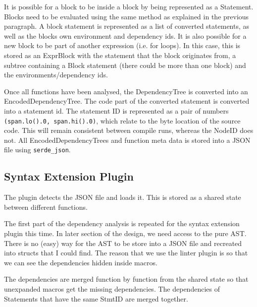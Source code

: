 It is possible for a block to be inside a block by being represented as a Statement. Blocks need to be evaluated using the same method as explained in the previous paragraph. A block statement is represented as a list of converted statements, as well as the blocks own environment and dependency ids. It is also possible for a new block to be part of another expression (i.e. for loops). In this case, this is stored as an ExprBlock with the statement that the block originates from, a subtree containing a Block statement (there could be more than one block) and the environments/dependency ids.

Once all functions have been analysed, the DependencyTree is converted into an EncodedDependencyTree. The code part of the converted statement is converted into a statement id. The statement ID is represented as a pair of numbers \texttt{(span.lo().0, span.hi().0)}, which relate to the byte location of the source code. This will remain consistent between compile runs, whereas the NodeID does not. All EncodedDependencyTrees and function meta data is stored into a JSON file using \texttt{serde\_json}.


\subsection{Syntax Extension Plugin}

The plugin detects the JSON file and loads it. This is stored as a shared state between different functions.

The first part of the dependency analysis is repeated for the syntax extension plugin this time. In later section of the design, we need access to the pure AST. There is no (easy) way for the AST to be store into a JSON file and recreated into structs that I could find. The reason that we use the linter plugin is so that we can see the dependencies hidden inside macros.

The dependencies are merged function by function from the shared state so that unexpanded macros get the missing dependencies. The dependencies of Statements that have the same StmtID are merged together.

